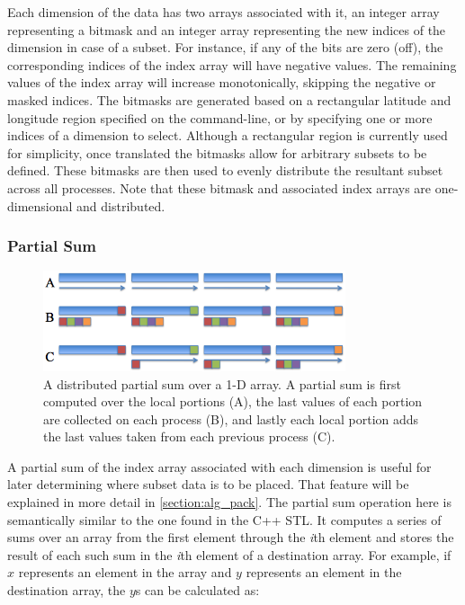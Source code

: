 Each dimension of the data has two arrays associated with it, an integer array
representing a bitmask and an integer array representing the new indices of
the dimension in case of a subset.  For instance, if any of the bits are
zero (off), the corresponding indices of the index array will have negative
values.  The remaining values of the index array will increase monotonically,
skipping the negative or masked indices.  The bitmasks are generated based on
a rectangular latitude and longitude region specified on the command-line, or
by specifying one or more indices of a dimension to select.  Although a
rectangular region is currently used for simplicity, once translated the
bitmasks allow for arbitrary subsets to be defined.  These bitmasks are then
used to evenly distribute the resultant subset across all processes.  Note
that these bitmask and associated index arrays are one-dimensional and
distributed.

\subsubsection{Partial Sum}

\begin{figure}[!t]
\center
\includegraphics[width=3.5in]{images/partialsum}
\caption{A distributed partial sum over a 1-D array.  A partial sum is first
computed over the local portions (A), the last values of each portion are
collected on each process (B), and lastly each local portion adds the last
values taken from each previous process (C).}
\label{fig:partialsum}
\end{figure}

A partial sum of the index array associated with each dimension is useful for
later determining where subset data is to be placed.  That feature will be
explained in more detail in \ref{section:alg_pack}.  The partial sum operation
here is semantically similar to the one found in the C++ STL\cite{CXXSTL}.  It
computes a series of sums over an array from the first element through the
\emph{i}th element and stores the result of each such sum in the \emph{i}th
element of a destination array.  For example, if $x$ represents an element in
the array and $y$ represents an element in the destination array, the $y$s can
be calculated as:

